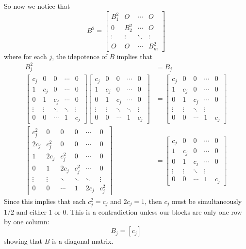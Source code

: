 \documentclass{article}
\begin{document}
\begin{solution}
So now we notice that 
\[
B^{2} =
\begin{bmatrix}
B_{1}^{2} & O & \cdots & O \\
0 & B_{2}^{2} & \cdots & O \\
\vdots & \vdots & \ddots & \vdots \\
O & O & \cdots & B_{m}^{2}
\end{bmatrix}
\]
where for each $j$, the idepotence of $B$ implies that 
\begin{align*}
B_{j}^{2} &= B_{j}\\
\begin{bmatrix}
c_{j} & 0 & 0 & \cdots & 0 \\
1 & c_{j} & 0 & \cdots & 0 \\
0 & 1 & c_{j} & \cdots & 0 \\
\vdots & \vdots & \ddots & \ddots & \vdots \\
0 & 0 & \cdots & 1 & c_{j}
\end{bmatrix}
\begin{bmatrix}
c_{j} & 0 & 0 & \cdots & 0 \\
1 & c_{j} & 0 & \cdots & 0 \\
0 & 1 & c_{j} & \cdots & 0 \\
\vdots & \vdots & \ddots & \ddots & \vdots \\
0 & 0 & \cdots & 1 & c_{j}
\end{bmatrix}
&= 
\begin{bmatrix}
c_{j} & 0 & 0 & \cdots & 0 \\
1 & c_{j} & 0 & \cdots & 0 \\
0 & 1 & c_{j} & \cdots & 0 \\
\vdots & \vdots & \ddots & \vdots \\
0 & 0 & \cdots & 1 & c_{j}
\end{bmatrix}
\\
\begin{bmatrix}
c_{j}^{2} & 0 & 0 & 0 & \cdots & 0 \\
2c_{j} & c_{j}^{2} & 0 & 0 & \cdots & 0 \\
1 & 2c_{j} & c_{j}^{2} & 0 & \cdots & 0 \\
0 & 1 & 2c_{j} & c_{j}^{2} & \cdots & 0 \\
\vdots & \vdots & \ddots & \ddots & \ddots & \vdots \\
0 & 0 & \cdots & 1 & 2c_{j} & c_{j}^{2}
\end{bmatrix}
&= 
\begin{bmatrix}
c_{j} & 0 & 0 & \cdots & 0 \\
1 & c_{j} & 0 & \cdots & 0 \\
0 & 1 & c_{j} & \cdots & 0 \\
\vdots & \vdots & \ddots & \vdots \\
0 & 0 & \cdots & 1 & c_{j}
\end{bmatrix}
\end{align*}
Since this implies that each $c_{j}^{2} = c_{j}$ and $2c_{j} = 1$, then $c_{j}$ must be simultaneously $1/2$ and either $1$ or $0$. This is a contradiction unless our blocks are only one row by one column:
\[ B_{j} = [c_{j}] \]
showing that $B$ is a diagonal matrix.
\end{solution}
\end{document}
